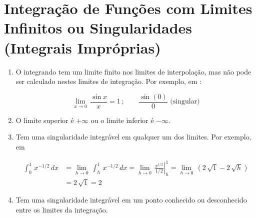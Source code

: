 \section{Integração de Funções com Limites Infinitos ou Singularidades (Integrais Impróprias)}

\begin{enumerate}

\item
O integrando tem um limite finito nos limites de interpolação, mas não pode ser calculado nestes limites de integração. Por exemplo,  em :

\[
 \lim_{x \to 0} \, \frac{\sin x}{x} = 1 \, ; \qquad \displaystyle \frac{\sin (0)}{0} \mbox{ (singular)}
\]

\item
O limite superior é $+\infty$ ou o limite inferior é $-\infty$.

\item
Tem uma singularidade integrável em qualquer um dos limites. Por exemplo,  em 

\[
 \begin{array}{ll}
  \displaystyle \int_0^1 \, x^{-1/2} \, dx & = \displaystyle \lim_{h \to 0} \, \int_h^1 \, x^{-1/2} \, dx = \lim_{h \to 0} \, \left. \displaystyle \frac{x^{1/2}}{1/2} \right|_h^1 = \lim_{h \to 0} \, (2\,\sqrt{1} - 2\,\sqrt{h}) \\
  & = 2\,\sqrt{1} = 2
 \end{array}
\]

\item
Tem uma singularidade integrável em um ponto conhecido ou desconhecido entre os limites da integração.

\end{enumerate}
